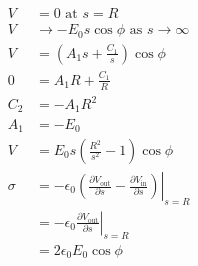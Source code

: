 \documentclass{article}
\begin{document}
\subsection{}

\begin{align*}
  V      & = 0 \text{ at } s = R                                                                                                                  \\
  V      & \rightarrow -E_0 s \cos \phi \text{ as } s \rightarrow \infty                                                                          \\
  V      & = \left( A_1 s + \frac{C_1}{s} \right) \cos \phi                                                                                       \\
  0      & = A_1 R + \frac{C_1}{R}                                                                                                                \\
  C_2    & = -A_1 R^2                                                                                                                             \\
  A_1    & = -E_0                                                                                                                                 \\
  V      & = E_0 s \left( \frac{R^2}{s^2} - 1 \right) \cos \phi                                                                                   \\
  \sigma & = -\epsilon_0 \left. \left( \frac{\partial V_\text{out}}{\partial s} - \frac{\partial V_\text{in}}{\partial s} \right) \right|_{s = R} \\
         & = -\epsilon_0 \left. \frac{\partial V_\text{out}}{\partial s} \right|_{s = R}                                                          \\
         & = 2 \epsilon_0 E_0 \cos \phi
\end{align*}

\setcounter{subsection}{26}
\subsection{}
\end{document}
